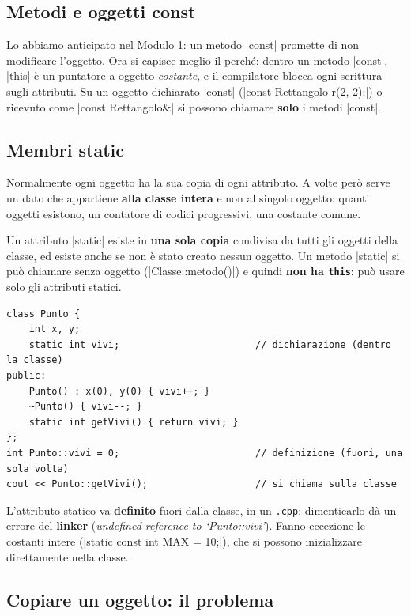 \subsection*{Metodi e oggetti const}

Lo abbiamo anticipato nel Modulo 1: un metodo \cc|const| promette di non
modificare l'oggetto. Ora si capisce meglio il perché: dentro un metodo \cc|const|,
\cc|this| è un puntatore a oggetto \emph{costante}, e il compilatore blocca ogni
scrittura sugli attributi. Su un oggetto dichiarato \cc|const|
(\cc|const Rettangolo r(2, 2);|) o ricevuto come \cc|const Rettangolo&| si possono
chiamare \textbf{solo} i metodi \cc|const|.

\subsection*{Membri static}

Normalmente ogni oggetto ha la sua copia di ogni attributo. A volte però serve un
dato che appartiene \textbf{alla classe intera} e non al singolo oggetto: quanti
oggetti esistono, un contatore di codici progressivi, una costante comune.

\begin{definizione}
Un attributo \cc|static| esiste in \textbf{una sola copia} condivisa da tutti gli
oggetti della classe, ed esiste anche se non è stato creato nessun oggetto. Un
metodo \cc|static| si può chiamare senza oggetto (\cc|Classe::metodo()|) e
quindi \textbf{non ha \texttt{this}}: può usare solo gli attributi statici.
\end{definizione}

\begin{lstlisting}
class Punto {
    int x, y;
    static int vivi;                        // dichiarazione (dentro la classe)
public:
    Punto() : x(0), y(0) { vivi++; }
    ~Punto() { vivi--; }
    static int getVivi() { return vivi; }
};
int Punto::vivi = 0;                        // definizione (fuori, una sola volta)
cout << Punto::getVivi();                   // si chiama sulla classe
\end{lstlisting}
L'attributo statico va \textbf{definito} fuori dalla classe, in un \texttt{.cpp}:
dimenticarlo dà un errore del \textbf{linker} (\emph{undefined reference to
`Punto::vivi'}). Fanno eccezione le costanti intere (\cc|static const int MAX = 10;|),
che si possono inizializzare direttamente nella classe.

\subsection*{Copiare un oggetto: il problema}

